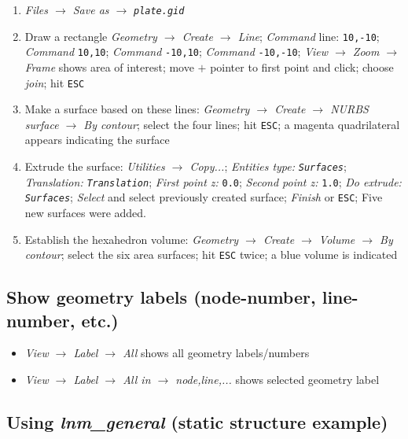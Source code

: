 \begin{enumerate}
\item \emph{Files $\rightarrow$ Save as $\rightarrow$} \texttt{\emph{plate.gid}}
\item Draw a rectangle \emph{Geometry $\rightarrow$ Create $\rightarrow$
Line}; \emph{Command} line: \texttt{10,-10}; \emph{Command} \texttt{10,10};
\emph{Command} \texttt{-10,10}; \emph{Command} \texttt{-10,-10}; \emph{View
$\rightarrow$ Zoom $\rightarrow$ Frame} shows area of interest;
move $+$ pointer to first point and click; choose \emph{join}; hit
\texttt{ESC}
\item Make a surface based on these lines: \emph{Geometry $\rightarrow$
Create $\rightarrow$ NURBS surface $\rightarrow$ By contour}; select
the four lines; hit \texttt{ESC}; a magenta quadrilateral appears
indicating the surface 
\item Extrude the surface: \emph{Utilities $\rightarrow$ Copy...}; \emph{Entities
type:} \texttt{\emph{Surfaces}}; \emph{Translation:} \texttt{\emph{Translation}};
\emph{First point z:} \texttt{0.0}; \emph{Second point z:} \texttt{1.0};
\emph{Do extrude:} \texttt{\emph{Surfaces}}; \emph{Select} and select
previously created surface; \emph{Finish} or \texttt{ESC}; Five new
surfaces were added. 
\item Establish the hexahedron volume: \emph{Geometry $\rightarrow$ Create
$\rightarrow$ Volume $\rightarrow$ By contour}; select the six area
surfaces; hit \texttt{ESC} twice; a blue volume is indicated 
\end{enumerate}


\subsection{Show geometry labels (node-number, line-number, etc.)}
\label{tut_struct:sec:show-geo-label}

\begin{itemize}
\item \emph{View $\rightarrow$ Label $\rightarrow$ All} shows all geometry
labels/numbers 
\item \emph{View $\rightarrow$ Label $\rightarrow$ All in $\rightarrow$
node,line,...} shows selected geometry label 
\end{itemize}

\subsection{Using \emph{lnm\_general} (static structure example)}

